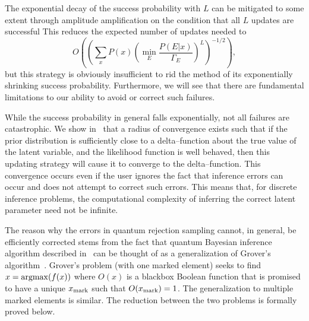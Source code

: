 \documentclass[aps,amsmath,onecolumn,amssymb,notitlepage]{revtex4-1}
\begin{document}
The exponential decay of the success probability with $L$ can be mitigated to some extent through amplitude amplification on the condition that all $L$ updates are successful  This reduces the expected number of updates needed to 
\begin{equation}
O\left(\left({\sum_x P(x) \left(\min_E \frac{P(E|x)}{\Gamma_E}\right)^L}\right)^{-1/2}\right),
\end{equation}
but this strategy is obviously insufficient to rid the method of its exponentially shrinking success probability.  Furthermore, we will see that there are fundamental limitations to our ability to avoid or correct such failures.
%


While the success probability in general falls exponentially, not all failures are catastrophic.  We show in~ that a radius of convergence exists such that if the prior distribution is sufficiently close to a delta--function about the true value of the latent variable, and the likelihood function is well behaved, then this updating strategy will cause it to converge to the delta--function.  This convergence occurs even if the user ignores the fact that inference errors can occur and does not attempt to correct such errors.  This means that, for discrete inference problems, the computational complexity of inferring the correct latent parameter need not be infinite.

The reason why the errors in quantum rejection sampling cannot, in general, be efficiently corrected stems from the fact that quantum Bayesian inference algorithm described in~ can be thought of as a generalization of Grover's algorithm~\cite{Gro96}.  Grover's problem (with one marked element) seeks to find $x = {\rm argmax}( f(x))$ where $O(x)$ is a blackbox Boolean function that is promised to have a unique $x_{\rm mark}$ such that $O(x_{\rm mark})=1$.  The generalization to multiple marked elements is similar.  The reduction between the two problems is formally proved below.
\end{document}

